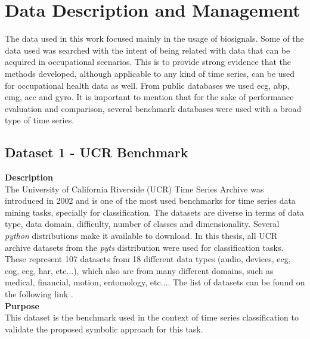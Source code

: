 
%

\chapter{Data Description and Management}
\label{cha:data}

The data used in this work focused mainly in the usage of biosignals. Some of the data used was searched with the intent of being related with data that can be acquired in occupational scenarios. This is to provide strong evidence that the methods developed, although applicable to any kind of time series, can be used for occupational health data as well. From public databases we used \gls{ecg}, \gls{abp}, \gls{emg}, \gls{acc} and \gls{gyro}. It is important to mention that for the sake of performance evaluation and comparison, several benchmark databases were used with a broad type of time series.

\section{Dataset 1 - UCR Benchmark}
\textbf{Description}\\
The University of California Riverside (UCR) Time Series Archive was introduced in 2002 and is one of the most used benchmarks for time series data mining tasks, specially for classification. The datasets are diverse in terms of data type, data domain, difficulty, number of classes and dimensionality\cite{ucr}. Several \textit{python} distributions make it available to download. In this thesis, all UCR archive datasets from the \textit{pyts} distribution were used for classification tasks. These represent 107 datasets from 18 different data types (audio, devices, \gls{ecg}, \gls{eog}, \gls{eeg}, \gls{har}, etc...), which also are from many different domains, such as medical, financial, motion, entomology, etc...\cite{ucr}. The list of datasets can be found on the following link \cite{ucr_site}.\\
\textbf{Purpose}\\
This dataset is the benchmark used in the context of time series classification to validate the proposed symbolic approach for this task. 
 
